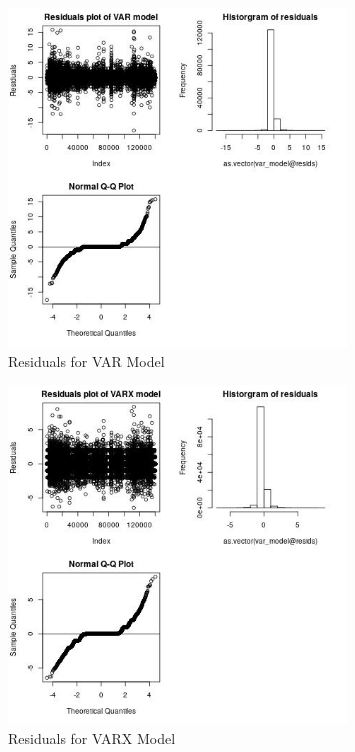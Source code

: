 \documentclass[12pt, letterpaper] {article}
\begin{document}
\begin{figure}[H]
    \centering
    \includegraphics[width=0.8\textwidth, height=0.42\textheight]{Images/Full_VAR_diff_resids.jpg}
    \caption{Residuals for VAR Model}
    \label{fig:Residuals for VAR Model}
\end{figure}

\begin{figure}[H]
    \centering
    \includegraphics[width=0.8\textwidth, height=0.42\textheight]{Images/Full_VARX_diff_resids.jpg}
    \caption{Residuals for VARX Model}
    \label{fig:Residuals for VARX Model}
\end{figure}
\end{document}
